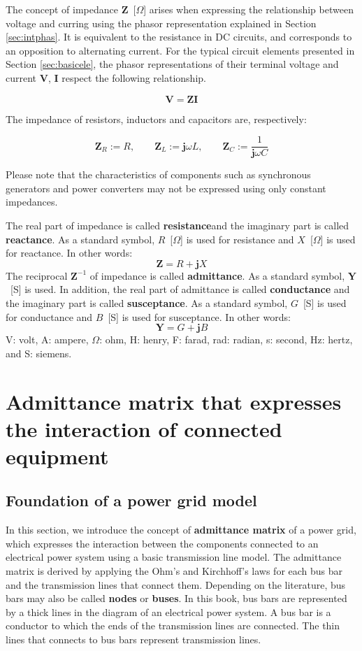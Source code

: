 \documentclass[graybox, envcountchap]{svmult}
\begin{document}
The concept of impedance $\bm{Z}$~[$\Omega$] arises when expressing the
relationship between voltage and curring using the phasor representation
explained in Section \ref{sec:intphas}. It is equivalent to the resistance in DC
circuits, and corresponds to an opposition to alternating current. For the
typical circuit elements presented in Section \ref{sec:basicele}, the phasor
representations of their terminal voltage and current $\bm{V}$, $\bm{I}$ respect
the following relationship.

\begin{equation}
  \bm{V} = \bm{Z}\bm{I}
\end{equation}

The impedance of resistors, inductors and capacitors are, respectively:

\[
  \bm{Z}_{R}:=R,\qquad
  \bm{Z}_{L}:=\bm{j}\omega L,\qquad
  \bm{Z}_{C}:=\frac{1}{\bm{j}\omega C}
\]

Please note that the characteristics of components such as synchronous
generators and power converters may not be expressed using only constant
impedances.

The real part of impedance is called \textbf{resistance}and the imaginary part
is called \textbf{reactance}. As a standard symbol, $R$~[$\Omega$] is used for
resistance and $X$~[$\Omega$] is used for reactance. In other words:
\[
  \bm{Z} = R + \bm{j} X
\]
The reciprocal $\bm{Z}^{-1}$ of impedance is called \textbf{admittance}.
As a standard symbol, $\bm{Y}$~[S] is used.
In addition, the real part of admittance is called \textbf{conductance} and the imaginary part is called \textbf{susceptance}.
As a standard symbol, $G$~[S] is used for conductance and $B$~[S] is used for susceptance.
In other words:
\[
\bm{Y} = G + \bm{j} B
\]
V: volt, A: ampere, $\Omega$: ohm, H: henry, F: farad, rad: radian, s: second, Hz: hertz, and S: siemens.

\section{Admittance matrix that expresses the interaction of connected equipment}\label{sec:transadm}

\subsection{Foundation of a power grid model}
In this section, we introduce the concept of \textbf{admittance matrix} of a
power grid, which expresses the interaction between the components connected to
an electrical power system using a basic transmission line model. The admittance
matrix is derived by applying the Ohm's and Kirchhoff's laws for each bus bar
and the transmission lines that connect them. Depending on the literature, bus
bars may also be called \textbf{nodes} or \textbf{buses}. In this book, bus bars
are represented by a thick lines in the diagram of an electrical power system.
A bus bar is a conductor to which the ends of the transmission lines are
connected. The thin lines that connects to bus bars represent transmission
lines. 
\end{document}
